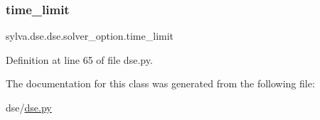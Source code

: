\subsubsection{\texorpdfstring{time\+\_\+limit}{time\_limit}}
{\footnotesize\ttfamily sylva.\+dse.\+dse.\+solver\+\_\+option.\+time\+\_\+limit}



Definition at line 65 of file dse.\+py.



The documentation for this class was generated from the following file\+:\begin{DoxyCompactItemize}
\item 
dse/\hyperlink{dse_8py}{dse.\+py}\end{DoxyCompactItemize}

